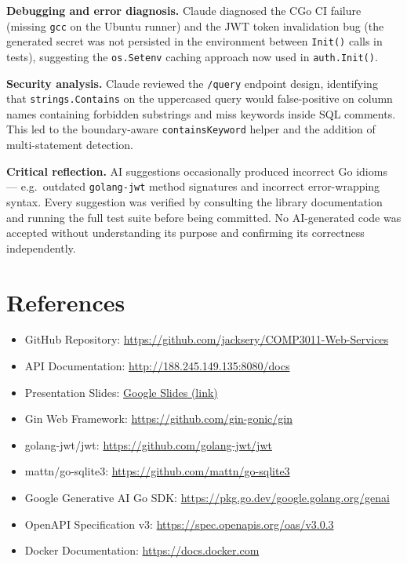 \documentclass[8pt,a4paper]{article}
\begin{document}
\textbf{Debugging and error diagnosis.} Claude diagnosed the CGo CI failure (missing \texttt{gcc} on the Ubuntu runner) and the JWT token invalidation bug (the generated secret was not persisted in the environment between \texttt{Init()} calls in tests), suggesting the \texttt{os.Setenv} caching approach now used in \texttt{auth.Init()}.

\textbf{Security analysis.} Claude reviewed the \texttt{/query} endpoint design, identifying that \texttt{strings.Contains} on the uppercased query would false-positive on column names containing forbidden substrings and miss keywords inside SQL comments. This led to the boundary-aware \texttt{containsKeyword} helper and the addition of multi-statement detection.

\textbf{Critical reflection.} AI suggestions occasionally produced incorrect Go idioms — e.g.\ outdated \texttt{golang-jwt} method signatures and incorrect error-wrapping syntax. Every suggestion was verified by consulting the library documentation and running the full test suite before being committed. No AI-generated code was accepted without understanding its purpose and confirming its correctness independently.

\appendix

\section{References}
\begin{itemize}
    \item GitHub Repository: \url{https://github.com/jacksery/COMP3011-Web-Services}
    \item API Documentation: \url{http://188.245.149.135:8080/docs}
    \item Presentation Slides: \href{https://docs.google.com/presentation/d/1HKU4cWUJhM8pYjJE6DzwXjU8x08xCCS2jBQ5iKM0qwI/edit?usp=sharing}{Google Slides (link)}
    \item Gin Web Framework: \url{https://github.com/gin-gonic/gin}
    \item golang-jwt/jwt: \url{https://github.com/golang-jwt/jwt}
    \item mattn/go-sqlite3: \url{https://github.com/mattn/go-sqlite3}
    \item Google Generative AI Go SDK: \url{https://pkg.go.dev/google.golang.org/genai}
    \item OpenAPI Specification v3: \url{https://spec.openapis.org/oas/v3.0.3}
    \item Docker Documentation: \url{https://docs.docker.com}
\end{itemize}
\end{document}
